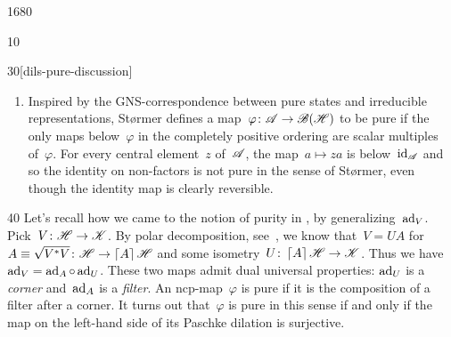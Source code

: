 \begin{parsec}{1680}
\begin{point}{10}
\begin{point}{30}[dils-pure-discussion]
\begin{enumerate}
\item
Inspired by the GNS-correspondence between pure states and
    irreducible representations,
St\o rmer defines a map~$\varphi\colon \mathscr{A} \to \mathscr{B}(\mathscr{H})$ to be pure
    if the only maps below~$\varphi$ in the completely positive ordering
    are scalar multiples of~$\varphi$.
For every central element~$z$ of~$\mathscr{A}$,
    the map~$a \mapsto za$ is below~$\mathrm{id}_{\mathscr{A}}$
    and so the identity on non-factors is not pure in the sense
        of St\o rmer,
        even though the identity map is clearly reversible.
\end{enumerate}
\spacingfix{}
\end{point}
\begin{point}{40}%
Let's recall how we came to the notion of purity in ,
    by generalizing~$\mathrm{ad}_V$.
Pick~$V \colon \mathscr{H} \to \mathscr{K}$.
    By polar decomposition, see~, we know that~$V = U A$
    for~$A \equiv \sqrt{V^*V} \colon \mathscr{H} \to \left\lceil A\right\rceil \mathscr{H}$
    and some isometry~$U \colon \left\lceil A\right\rceil \mathscr{H} \to \mathscr{K}$.
Thus we have~$\mathrm{ad}_V = \mathrm{ad}_A \mathop{\circ} \mathrm{ad}_U$.
These two maps admit dual universal properties:
    $\mathrm{ad}_U$ is a \emph{corner}
    and~$\mathrm{ad}_A$ is a \emph{filter}.
An ncp-map~$\varphi$ is pure
    if it is the composition of a filter after a corner.
It turns out that~$\varphi$ is pure in this sense
    if and only if the map on the left-hand side of
    its Paschke dilation is surjective.
\end{point}
\end{point}
\end{parsec}

